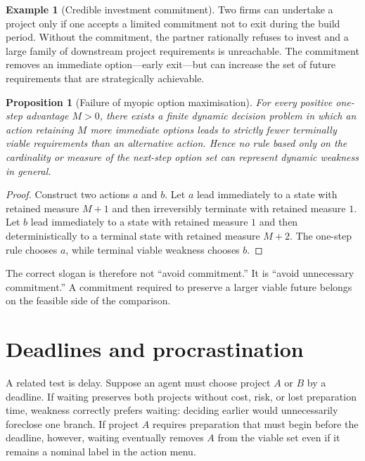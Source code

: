 \documentclass[11pt]{article}
\newtheorem{proposition}[theorem]{Proposition}
\theoremstyle{definition}
\newtheorem{example}[theorem]{Example}
\begin{document}
\begin{example}[Credible investment commitment]
Two firms can undertake a project only if one accepts a limited commitment not to exit during the build period. Without the commitment, the partner rationally refuses to invest and a large family of downstream project requirements is unreachable. The commitment removes an immediate option---early exit---but can increase the set of future requirements that are strategically achievable.
\end{example}

\begin{proposition}[Failure of myopic option maximisation]\label{prop:myopic}
For every positive one-step advantage $M>0$, there exists a finite dynamic decision problem in which an action retaining $M$ more immediate options leads to strictly fewer terminally viable requirements than an alternative action. Hence no rule based only on the cardinality or measure of the next-step option set can represent dynamic weakness in general.
\end{proposition}

\begin{proof}
Construct two actions $a$ and $b$. Let $a$ lead immediately to a state with retained measure $M+1$ and then irreversibly terminate with retained measure $1$. Let $b$ lead immediately to a state with retained measure $1$ and then deterministically to a terminal state with retained measure $M+2$. The one-step rule chooses $a$, while terminal viable weakness chooses $b$.
\end{proof}

The correct slogan is therefore not ``avoid commitment.'' It is ``avoid unnecessary commitment.'' A commitment required to preserve a larger viable future belongs on the feasible side of the comparison.

\section{Deadlines and procrastination}

A related test is delay. Suppose an agent must choose project $A$ or $B$ by a deadline. If waiting preserves both projects without cost, risk, or lost preparation time, weakness correctly prefers waiting: deciding earlier would unnecessarily foreclose one branch. If project $A$ requires preparation that must begin before the deadline, however, waiting eventually removes $A$ from the viable set even if it remains a nominal label in the action menu.
\end{document}
